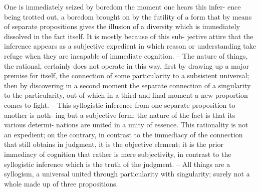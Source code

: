 One is immediately seized by boredom the moment one hears this infer-
ence being trotted out, a boredom brought on by the futility of a form that
by means of separate propositions gives the illusion of a diversity which
is immediately dissolved in the fact itself. It is mostly because of this sub-
jective attire that the inference appears as a subjective expedient in which
reason or understanding take refuge when they are incapable of immediate
cognition. – The nature of things, the rational, certainly does not operate
in this way, first by drawing up a major premise for itself, the connection of
some particularity to a subsistent universal; then by discovering in a second
moment the separate connection of a singularity to the particularity, out
of which in a third and final moment a new proportion comes to light. –
This syllogistic inference from one separate proposition to another is noth-
ing but a subjective form; the nature of the fact is that its various determi-
nations are united in a unity of essence. This rationality is not an expedient;
on the contrary, in contrast to the immediacy of the connection that still
obtains in judgment, it is the objective element; it is the prior immediacy
of cognition that rather is mere subjectivity, in contrast to the syllogistic
inference which is the truth of the judgment. – All things are a syllogism, a
universal united through particularity with singularity; surely not a whole
made up of three propositions.

